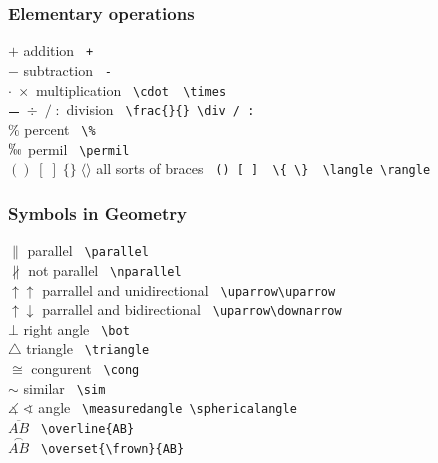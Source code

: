 \subsubsection{Elementary operations}
\begin{tabbing}
\mySymbols
$ +$                  \> addition                                \> \verb` + `       \\
$ -$                  \> subtraction                             \> \verb` - `       \\
$ \cdot \; \times$    \> multiplication                          \> \verb` \cdot  \times `      \\
$ \frac{\quad}{\quad}\; \div\;/ \; :$\> division                 \> \verb` \frac{}{} \div / : ` \\
$ \%$                 \> percent                                 \> \verb` \% `      \\
$ \permil$            \> permil                                  \> \verb` \permil ` \\
$ ()\; [ \;] \; \{ \} \; \langle \rangle$ \> all sorts of braces \> \verb` () [ ]  \{ \}  \langle \rangle ` \\
\end{tabbing}

\subsubsection{Symbols in Geometry}
\begin{tabbing}
\mySymbols
$ {\parallel}$                \> parallel                        \> \verb` \parallel `           \\
$ {\nparallel}$               \> not parallel                    \> \verb` \nparallel `          \\
$ {\uparrow\uparrow}$         \> parrallel and unidirectional    \> \verb` \uparrow\uparrow    ` \\
$ {\uparrow\downarrow}$       \> parrallel and bidirectional     \> \verb` \uparrow\downarrow `  \\
$ {\bot}$                     \> right angle                     \> \verb` \bot `                \\
$ {\triangle}$                \> triangle                        \> \verb` \triangle  `          \\
$ {\cong}$                    \> congurent                       \> \verb` \cong `               \\
$ {\sim}$                     \> similar                         \> \verb` \sim `                \\
$\measuredangle\;\sphericalangle$  \> angle                      \> \verb` \measuredangle \sphericalangle` \\
$ \overline{AB}$              \>                                 \> \verb` \overline{AB} `       \\
$ {\overset{\frown}{AB}}$     \>                                 \> \verb` \overset{\frown}{AB}` \\
\end{tabbing}

